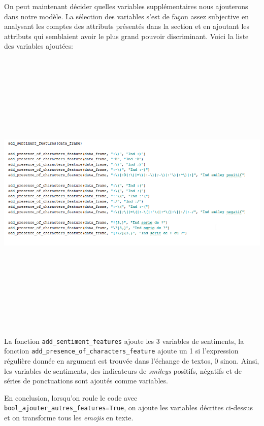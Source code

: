 On peut maintenant décider quelles variables supplémentaires nous ajouterons dans notre modèle. 
La sélection des variables s'est de façon assez subjective en analysant les comptes des attributs présentés dans la section  et en ajoutant les attributs qui semblaient avoir le plus grand pouvoir discriminant.
Voici la liste des variables ajoutées:

\includegraphics[width=\linewidth,height=14cm]{images/variables_autres}

La fonction \verb|add_sentiment_features| ajoute les 3 variables de sentiments, la fonction \verb|add_presence_of_characters_feature| ajoute un 1 si l'expression régulière donnée en argument est trouvée dans l'échange de textos, 0 sinon. Ainsi, les variables de sentiments, des indicateurs de \emph{smileys} positifs, négatifs et de séries de ponctuations sont ajoutés comme variables.

En conclusion, lorsqu'on roule le code avec \verb|bool_ajouter_autres_features=True|, on ajoute les variables décrites ci-dessus et on transforme tous les \emph{emojis} en texte.